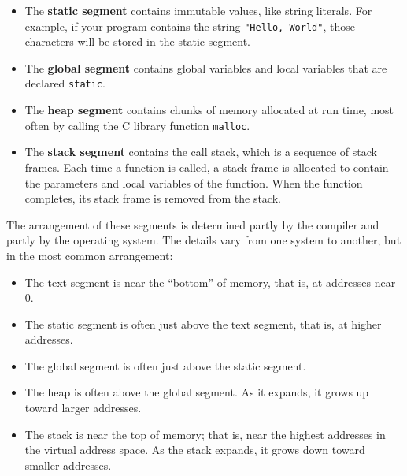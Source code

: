 \documentclass[12pt]{book}
\begin{document}
{\begin{itemize}
\item The {\bf static segment} contains immutable values, like string
literals.  For example, if your program contains the string
{\tt "Hello, World"}, those characters will be stored in the
static segment.

\item The {\bf global segment} contains global variables and local variables that are declared {\tt static}.

\item The {\bf heap segment} contains chunks of memory allocated
  at run time, most often by calling the C library function
  {\tt malloc}.

\item The {\bf stack segment} contains the call stack, which is a
  sequence of stack frames.  Each time a function is called, a stack
  frame is allocated to contain the 
  parameters and local variables of the function.  When the function
  completes, its stack frame is removed from the stack.

\end{itemize}

The arrangement of these segments is determined partly by the 
compiler and partly by the operating system.  The details vary
from one system to another, but in the most common arrangement:

\begin{itemize}

\item The text segment is near the ``bottom'' of memory, that is,
  at addresses near 0.

\item The static segment is often just above the text segment, that is,
at higher addresses.

\item The global segment is often just above the static segment.

\item The heap is often above the global segment.  As it expands,
  it grows up toward larger addresses.
  
\item The stack is near the top of memory; that is, near the
  highest addresses in the virtual address space.  As the
  stack expands, it grows down toward smaller addresses.

\end{itemize}


}
\end{document}
